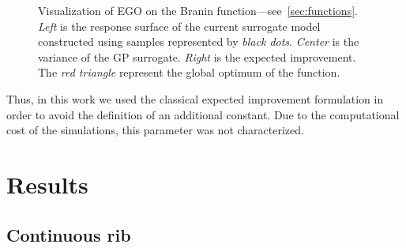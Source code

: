 \begin{figure}[!h]               
\centering
{}
   
\caption{Visualization of EGO on the Branin function---see~\cref{sec:functions}. \emph{Left} is the response surface of the current surrogate model constructed using samples represented by \emph{black dots}. \emph{Center} is the variance of the GP surrogate. \emph{Right} is the expected improvement. The \emph{red triangle} represent the global optimum of the function.}
\label{fig:branin_ego}
\end{figure}

Thus, in this work we used the classical expected improvement formulation in order to avoid the definition of an additional constant. Due to the computational cost of the simulations, this parameter was not characterized.

\section{Results}
\label{sec:optim_results}

\subsection{Continuous rib}
\label{sec:continuous_rib}


